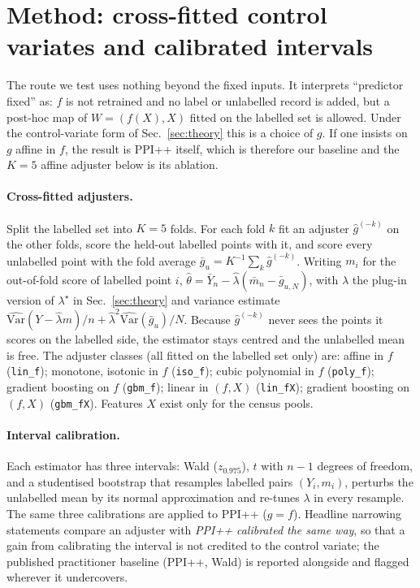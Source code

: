 \section{Method: cross-fitted control variates and calibrated intervals}
\label{sec:method}

The route we test uses nothing beyond the fixed inputs. It interprets ``predictor fixed'' as: $f$ is not retrained and
no label or unlabelled record is added, but a post-hoc map of $W=(f(X),X)$ fitted on the labelled set is allowed.
Under the control-variate form of Sec.~\ref{sec:theory} this is a choice of $g$. If one insists on $g$ affine in $f$,
the result is PPI++ itself, which is therefore our baseline and the $K\!=\!5$ affine adjuster below is its ablation.

\paragraph{Cross-fitted adjusters.}
Split the labelled set into $K=5$ folds. For each fold $k$ fit an adjuster $\hat g^{(-k)}$ on the other folds, score the held-out
labelled points with it, and score every unlabelled point with the fold average $\bar g_u=K^{-1}\sum_k\hat g^{(-k)}$.
Writing $m_i$ for the out-of-fold score of labelled point $i$,
$\hat\theta=\bar Y_n-\hat\lambda(\bar m_n-\bar g_{u,N})$, with $\hat\lambda$ the plug-in version of $\lambda^\star$
in Sec.~\ref{sec:theory} and variance estimate $\widehat{\mathrm{Var}}(Y-\hat\lambda m)/n+\hat\lambda^2\widehat{\mathrm{Var}}(\bar g_u)/N$.
Because $\hat g^{(-k)}$ never sees the points it scores on the labelled side, the estimator stays centred and the
unlabelled mean is free.
The adjuster classes (all fitted on the labelled set only) are: affine in $f$ (\texttt{lin\_f}); monotone, isotonic in $f$
(\texttt{iso\_f}); cubic polynomial in $f$ (\texttt{poly\_f}); gradient boosting on $f$ (\texttt{gbm\_f}); linear in $(f,X)$
(\texttt{lin\_fX}); gradient boosting on $(f,X)$ (\texttt{gbm\_fX}). Features $X$ exist only for the census pools.

\paragraph{Interval calibration.}
Each estimator has three intervals: Wald ($z_{0.975}$), $t$ with $n-1$ degrees of freedom, and a studentised bootstrap
that resamples labelled pairs $(Y_i,m_i)$, perturbs the unlabelled mean by its normal approximation and re-tunes $\lambda$
in every resample. The same three calibrations are applied to PPI++ ($g=f$). Headline narrowing statements compare an
adjuster with \emph{PPI++ calibrated the same way}, so that a gain from calibrating the interval is not credited to the control variate;
the published practitioner baseline (PPI++, Wald) is reported alongside and flagged wherever it undercovers.

